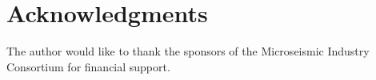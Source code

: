 \documentclass[letterpaper,11pt]{article}
\begin{document}



\section*{Acknowledgments}
%
The author would like to thank the sponsors of the Microseismic Industry Consortium for financial support.



\end{document}
